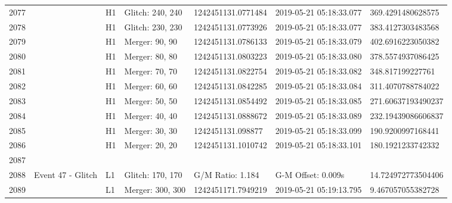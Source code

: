 \begin{longtable}{lllllll}
2077 &                                                    &       H1 &  Glitch: 240, 240 &  1242451131.0771484 &  2019-05-21 05:18:33.077 &   369.4291480628575 \\
2078 &                                                    &       H1 &  Glitch: 230, 230 &  1242451131.0773926 &  2019-05-21 05:18:33.077 &   383.4127303483568 \\
2079 &                                                    &       H1 &    Merger: 90, 90 &  1242451131.0786133 &  2019-05-21 05:18:33.079 &   402.6916223050382 \\
2080 &                                                    &       H1 &    Merger: 80, 80 &  1242451131.0803223 &  2019-05-21 05:18:33.080 &   378.5574937086425 \\
2081 &                                                    &       H1 &    Merger: 70, 70 &  1242451131.0822754 &  2019-05-21 05:18:33.082 &    348.817199227761 \\
2082 &                                                    &       H1 &    Merger: 60, 60 &  1242451131.0842285 &  2019-05-21 05:18:33.084 &   311.4070788784022 \\
2083 &                                                    &       H1 &    Merger: 50, 50 &  1242451131.0854492 &  2019-05-21 05:18:33.085 &  271.60637193490237 \\
2084 &                                                    &       H1 &    Merger: 40, 40 &  1242451131.0888672 &  2019-05-21 05:18:33.089 &  232.19439086606837 \\
2085 &                                                    &       H1 &    Merger: 30, 30 &   1242451131.098877 &  2019-05-21 05:18:33.099 &   190.9200997168441 \\
2086 &                                                    &       H1 &    Merger: 20, 20 &  1242451131.1010742 &  2019-05-21 05:18:33.101 &   180.1921233742332 \\
2087 &                                                    &          &                   &                     &                          &                     \\
2088 &                                  Event 47 - Glitch &       L1 &  Glitch: 170, 170 &    G/M Ratio: 1.184 &       G-M Offset: 0.009s &  14.724972773504406 \\
2089 &                                                    &       L1 &  Merger: 300, 300 &  1242451171.7949219 &  2019-05-21 05:19:13.795 &   9.467057055382728 \\

\end{longtable}
